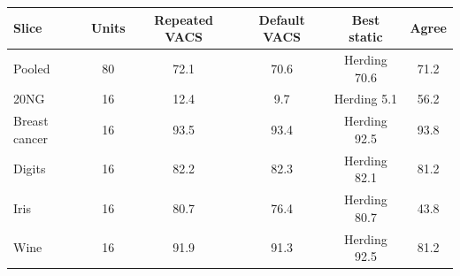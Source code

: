 \begin{tabular}{lccccc}
\toprule
Slice & Units & Repeated VACS & Default VACS & Best static & Agree \\
\midrule
Pooled & 80 & 72.1 & 70.6 & Herding 70.6 & 71.2 \\
20NG & 16 & 12.4 & 9.7 & Herding 5.1 & 56.2 \\
Breast cancer & 16 & 93.5 & 93.4 & Herding 92.5 & 93.8 \\
Digits & 16 & 82.2 & 82.3 & Herding 82.1 & 81.2 \\
Iris & 16 & 80.7 & 76.4 & Herding 80.7 & 43.8 \\
Wine & 16 & 91.9 & 91.3 & Herding 92.5 & 81.2 \\
\bottomrule
\end{tabular}
